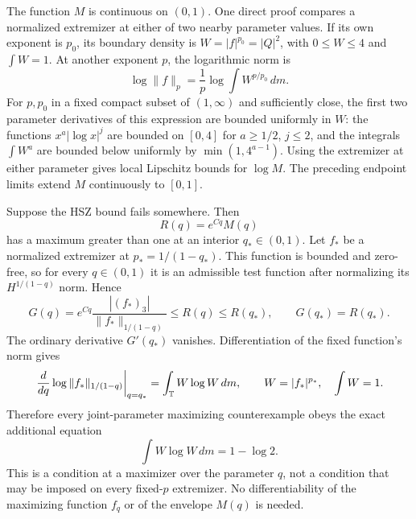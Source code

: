 The function $M$ is continuous on $(0,1)$. One direct proof compares a
normalized extremizer at either of two nearby parameter values. If its
own exponent is $p_0$, its boundary density is
$W=|f|^{p_0}=|Q|^2$, with $0\leq W\leq4$ and $\int W=1$.
At another exponent $p$, the logarithmic norm is
\[
 \log\|f\|_p=\frac1p\log\int W^{p/p_0}\,dm.
\]
For $p,p_0$ in a fixed compact subset of $(1,\infty)$ and sufficiently
close, the first two parameter derivatives of this expression are bounded
uniformly in $W$: the functions $x^a|\log x|^j$ are bounded on $[0,4]$
for $a\geq1/2$, $j\leq2$, and the integrals $\int W^a$ are bounded below
uniformly by $\min(1,4^{a-1})$.
Using the extremizer at either parameter gives local Lipschitz bounds for
$\log M$. The preceding endpoint limits extend $M$ continuously to $[0,1]$.

Suppose the HSZ bound fails somewhere. Then
\[
 R(q)=e^{Cq}M(q)
\]
has a maximum greater than one at an interior $q_*\in(0,1)$.
Let $f_*$ be a normalized extremizer at $p_*=1/(1-q_*)$.
This function is bounded and zero-free, so for every $q\in(0,1)$ it is an
admissible test function after normalizing its $H^{1/(1-q)}$ norm. Hence
\[
 G(q)=e^{Cq}\frac{|(f_*)_3|}{\|f_*\|_{1/(1-q)}}\leq R(q)\leq R(q_*),
 \qquad G(q_*)=R(q_*).
\]
The ordinary derivative $G'(q_*)$ vanishes. Differentiation of the fixed
function's norm gives
\[
 \left.\frac{d}{dq}\log\|f_*\|_{1/(1-q)}\right|_{q=q_*}
 =\int_{\mathbb T}W\log W\,dm,
 \qquad W=|f_*|^{p_*},\quad\int W=1.
\]
Therefore every joint-parameter maximizing counterexample obeys the exact
additional equation
\[
 \boxed{\int W\log W\,dm=1-\log2.}
\]
This is a condition at a maximizer over the parameter $q$, not a condition
that may be imposed on every fixed-$p$ extremizer. No differentiability of
the maximizing function $f_q$ or of the envelope $M(q)$ is needed.


